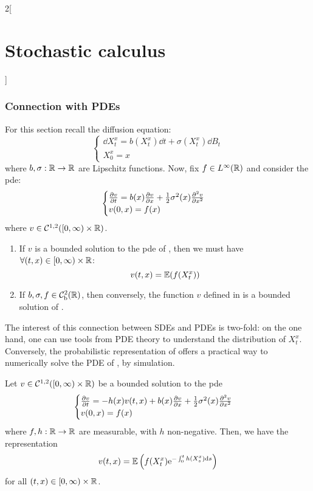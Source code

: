 \documentclass[../../../main_math.tex]{subfiles}
\begin{document}
\begin{multicols}{2}[\section{Stochastic calculus}]
  \subsubsection{Connection with PDEs}
  For this section recall the diffusion equation:
  \begin{equation}\label{SC:sde_pde}
    \begin{cases}
      \dd{X_t^x}=b(X_t^x)\dd{t}+\sigma(X_t^x)\dd{B_t} \\
      X_0^x=x
    \end{cases}
  \end{equation}
  where $b,\sigma:\mathbb{R}\to\mathbb{R}$ are Lipschitz functions. Now, fix $f\in L^\infty(\mathbb{R})$ and consider the pde:
  \begin{equation}\label{SC:pde_sde}
    \begin{cases}
      \pdv{v}{t}(t,x)=b(x)\pdv{v}{x}(t,x)+\frac{1}{2}\sigma^2(x)\pdv[2]{v}{x}(t,x) \\
      v(0,x)=f(x)
    \end{cases}
  \end{equation}
  where $v\in \mathcal{C}^{1,2}([0,\infty)\times\mathbb{R})$.
  \begin{theorem}\hfill
    \begin{enumerate}
      \item If $v$ is a bounded solution to the pde of , then we must have $\forall (t,x)\in [0,\infty)\times\mathbb{R}$:
            \begin{equation}\label{SC:sol_v}
              v(t,x)=\mathbb{E}(f(X_t^x))
            \end{equation}
      \item If $b,\sigma, f\in \mathcal{C}_\text{b}^2(\mathbb{R})$, then conversely, the function $v$ defined in  is a bounded solution of .
    \end{enumerate}
  \end{theorem}
  \begin{remark}
    The interest of this connection between SDEs and PDEs is two-fold: on the one hand, one can use tools from PDE theory to understand the distribution of $X_t^x$. Conversely, the probabilistic representation of  offers a practical way to numerically solve the PDE of , by simulation.
  \end{remark}
  \begin{theorem}
    Let $v\in \mathcal{C}^{1,2}([0,\infty)\times\mathbb{R})$ be a bounded solution to the pde
    $$
      \begin{cases}
        \pdv{v}{t}(t,x)=-h(x)v(t,x)+b(x) \pdv{v}{x}(t,x)+\frac{1}{2}\sigma^2(x)\pdv[2]{v}{x}(t,x) \\
        v(0,x)=f(x)
      \end{cases}
    $$
    where $f,h:\mathbb{R}\to\mathbb{R}$ are measurable, with $h$ non-negative. Then, we have the representation
    $$
      v(t,x)=\mathbb{E}\left(f(X_t^x)\mathrm{e}^{-\int_0^t h(X_s^x)\dd{s}}\right)
    $$
    for all $(t,x)\in [0,\infty)\times\mathbb{R}$.
  \end{theorem}
\end{multicols}
\end{document}
